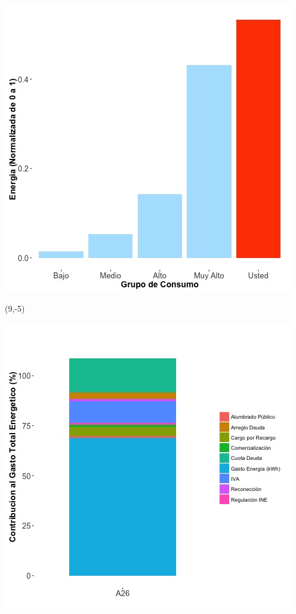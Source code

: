 \documentclass{article}\usepackage[]{graphicx}\usepackage[]{color}
\newenvironment{knitrout}{}{} %
\begin{document}
\begin{knitrout}
\color{fgcolor}
\includegraphics[scale=0.65]{figure/A26_neighbor_plot} 
\end{knitrout}

 \begin{textblock}{1}(9,-5)
\begin{minipage}{20em}
\begingroup

\endgroup
\end{minipage}
\end{textblock}

\begin{knitrout}
\color{fgcolor}
\includegraphics[scale=0.65]{figure/A26_costvars_plot.jpg} 
\end{knitrout}
\end{document}
